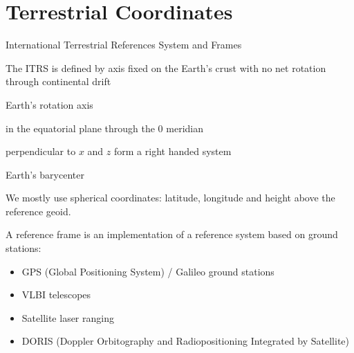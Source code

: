 \documentclass[aspectratio=1610, 9pt]{beamer}
\begin{document}
\section{Terrestrial Coordinates}

\begin{frame}{International Terrestrial References System and Frames}

  The ITRS is defined by axis fixed on the Earth's crust with no net rotation
  through continental drift

  \begin{description}[$(0,0,0)$]
    \item[$\color{vertexDarkRed} z$-Axis] Earth's rotation axis
    \item[$\color{vertexDarkRed} x$-Axis] in the equatorial plane through the 0 meridian
    \item[$\color{vertexDarkRed} y$-Axis] perpendicular to $x$ and $z$ form a right handed system
    \item[$\color{vertexDarkRed} (0, 0, 0)$] Earth's barycenter
  \end{description}

  We mostly use spherical coordinates: latitude, longitude and height above
  the reference geoid.

  \bigskip

  A reference frame is an implementation of a reference system based on ground stations:

  \begin{itemize}
    \item GPS (Global Positioning System) / Galileo ground stations
    \item VLBI telescopes
    \item Satellite laser ranging
    \item DORIS (Doppler Orbitography and Radiopositioning Integrated by Satellite)
  \end{itemize}
\end{frame}
\end{document}
